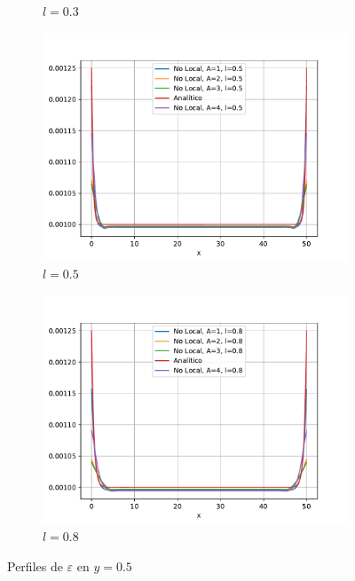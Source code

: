 \begin{figure}
\begin{subfigure}{0.48\textwidth}
		        \caption{$l=0.3$}
		        \label{fig:perfilesbarraY05.03}
		    \end{subfigure}
		    \quad
		    \begin{subfigure}{0.48\textwidth}
		    \centering
		        \includegraphics[width=\textwidth]{figuras/Barra/Perfiles/Y/Y0.5_0.5.pdf}
		        \caption{$l=0.5$}
		        \label{fig:perfilesbarraY05.05}
		    \end{subfigure}
		    \begin{subfigure}{0.48\textwidth}
		    \centering
		        \includegraphics[width=\textwidth]{figuras/Barra/Perfiles/Y/Y0.8_0.5.pdf}
		        \caption{$l=0.8$}
		        \label{fig:perfilesbarraY05.08}
		    \end{subfigure}
		    \caption{Perfiles de $\varepsilon$ en $y=0.5$}
		    \label{fig:perfilesbarraY05}
		\end{figure}
